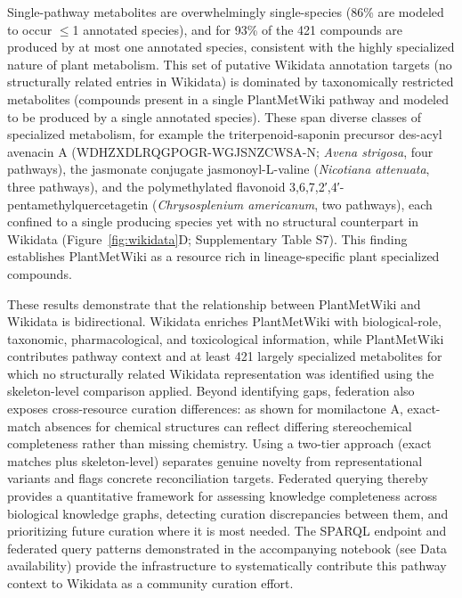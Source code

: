 \documentclass[11pt,a4paper]{article}
\begin{document}
Single-pathway metabolites are overwhelmingly single-species (86\% are modeled to occur $\leq$1 annotated
species), and for 93\% of the 421 compounds are produced by at most one annotated species,
consistent with the highly specialized nature of plant metabolism. This set of putative Wikidata
annotation targets (no structurally related entries in Wikidata) is dominated by taxonomically restricted metabolites
(compounds present in a single PlantMetWiki pathway and modeled to be produced by a single annotated species). These
span diverse classes of specialized metabolism, for example the triterpenoid-saponin precursor des-acyl avenacin A
(WDHZXDLRQGPOGR-WGJSNZCWSA-N; \textit{Avena strigosa}, four pathways), the jasmonate conjugate
jasmonoyl-L-valine (\textit{Nicotiana attenuata}, three pathways), and the polymethylated flavonoid
3,6,7,2′,4′-pentamethylquercetagetin (\textit{Chrysosplenium americanum}, two pathways), each confined
to a single producing species yet with no structural counterpart in Wikidata
(Figure~\ref{fig:wikidata}D; Supplementary Table S7). This finding establishes PlantMetWiki as a
resource rich in lineage-specific plant specialized compounds.

These results demonstrate that the relationship between PlantMetWiki and Wikidata is bidirectional.
Wikidata enriches PlantMetWiki with biological-role, taxonomic, pharmacological, and toxicological
information, while PlantMetWiki contributes pathway context and at least 421 largely specialized
metabolites for which no structurally related Wikidata representation was identified using
the skeleton-level comparison applied. Beyond
identifying gaps, federation also exposes cross-resource curation differences: as shown for momilactone
A, exact-match absences for chemical structures can reflect differing stereochemical completeness rather than missing
chemistry. Using a two-tier approach (exact matches plus skeleton-level) separates genuine novelty from
representational variants and flags concrete reconciliation targets. Federated querying thereby
provides a quantitative framework for assessing knowledge completeness across biological knowledge
graphs, detecting curation discrepancies between them, and prioritizing future curation where
it is most needed. The SPARQL endpoint and federated query patterns demonstrated in the accompanying
notebook (see Data availability) provide the infrastructure to systematically contribute this pathway
context to Wikidata as a community curation effort.

\end{document}
